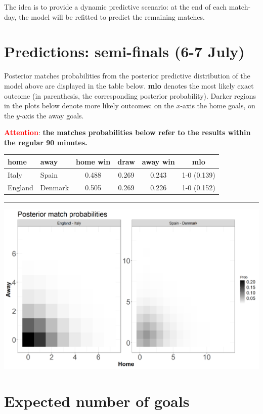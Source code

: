 \documentclass[
  10pt,
]{article}
\begin{document}
The idea is to provide a dynamic predictive scenario: at the end of each
match-day, the model will be refitted to predict the remaining matches.

\hypertarget{groupstage-predictions-semi-finals-6-7-july}{%
\section{Predictions: semi-finals (6-7
July)}\label{groupstage-predictions-semi-finals-6-7-july}}

Posterior matches probabilities from the posterior predictive
distribution of the model above are displayed in the table below.
\textbf{mlo} denotes the most likely exact outcome (in parenthesis, the
corresponding posterior probability). Darker regions in the plots below
denote more likely outcomes: on the \(x\)-axis the home goals, on the
\(y\)-axis the away goals.

\textcolor{red}{\textbf{Attention}}: \textbf{the matches probabilities below refer to the results
within the regular 90 minutes.}

\begin{longtable}[]{@{}llcccc@{}}
\toprule
home & away & home win & draw & away win & mlo\tabularnewline
\midrule
\endhead
Italy & Spain & 0.488 & 0.269 & 0.243 & 1-0 (0.139)\tabularnewline
England & Denmark & 0.505 & 0.269 & 0.226 & 1-0 (0.152)\tabularnewline
\bottomrule
\end{longtable}

\begin{center}\rule{0.5\linewidth}{0.5pt}\end{center}

\begin{center}\includegraphics[width=0.8\linewidth]{figs/data2-1} \end{center}

\hypertarget{expected-number-of-goals}{%
\section{Expected number of goals}\label{expected-number-of-goals}}
\end{document}
